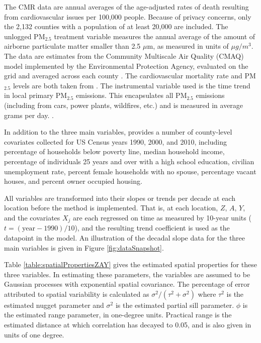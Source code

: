 \documentclass[12pt]{article}
\begin{document}
The CMR data are annual averages of the age-adjusted rates of death resulting from cardiovascular issues per 100,000 people. Because of privacy concerns, only the 2,132 counties with a population of at least 20,000 are included. The unlogged PM$_{2.5}$ treatment variable measures the annual average of the amount of airborne particulate matter smaller than 2.5 $\mu$m, as measured in units of $\mu g/m^3$. The data are estimates from the Community Multiscale Air Quality (CMAQ) model implemented by the Environmental Protection Agency, evaluated on the grid and averaged across each county \citep{us_epa_office_of_research_and_developmen_2020_4081737}. The cardiovascular mortality rate and PM$_{2.5}$ levels are both taken from \cite{wyatt2020annual}. The instrumental variable used is the time trend in local primary PM$_{2.5}$ emissions. This encapsulates all PM$_{2.5}$ emissions (including from cars, power plants, wildfires, etc.) and is measured in average grams per day. \citep{peterson2020impact}.

In addition to the three main variables, \cite{wyatt2020annual} provides a number of county-level covariates collected for US Census years 1990, 2000, and 2010, including percentage of households below poverty line, median household income, percentage of individuals 25 years and over with a high school education, civilian unemployment rate, percent female households with no spouse, percentage vacant houses, and percent owner occupied housing.

All variables are transformed into their slopes or trends per decade at each location before the method is implemented. That is, at each location, $Z$, $A$, $Y$, and the covariates $X_j$ are each regressed on time as measured by 10-year units ($t = (\text{year} - 1990)/10$), and the resulting trend coefficient is used as the datapoint in the model. An illustration of the decadal slope data for the three main variables is given in Figure \ref{fig:dataSnapshot}. 

Table \ref{table:spatialPropertiesZAY} gives the estimated spatial properties for these three variables. In estimating these parameters, the variables are assumed to be Gaussian processes with exponential spatial covariance. The percentage of error attributed to spatial variability is calculated as $\sigma^2/(\tau^2 + \sigma^2)$ where $\tau^2$ is the estimated nugget parameter and $\sigma^2$ is the estimated partial sill parameter. $\phi$ is the estimated range parameter, in one-degree units. Practical range is the estimated distance at which correlation has decayed to 0.05, and is also given in units of one degree.
\end{document}
